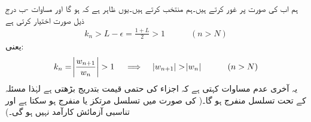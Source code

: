 ہم اب  کی صورت پر غور کرتے ہیں۔ہم  منتخب کرتے ہیں۔یوں ظاہر ہے کہ  ہو گا اور  مساوات -ب درج ذیل صورت اختیار کرتی ہے
\begin{align}
k_n>L-\epsilon=\frac{1+L}{2}>1\quad \quad \quad (n>N)
\end{align}
یعنی:
\begin{align}
k_n=\abs{\frac{w_{n+1}}{w_n}}>1 \quad \implies \quad \abs{w_{n+1}}>\abs{w_n} \quad \quad \quad (n>N)
\end{align}
یہ آخری عدم مساوات کہتی ہے کہ اجزاء کی حتمی قیمت بتدریج بڑھتی ہے لہٰذا مسئلہ  کے تحت تسلسل منفرج ہو گا۔( کی صورت میں تسلسل مرتکز یا منفرج ہو سکتا ہے اور  تناسبی آزمائش کارآمد نہیں ہو گی۔)

